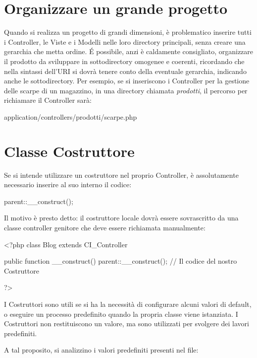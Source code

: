 \section*{Organizzare un grande progetto}
Quando si realizza un progetto di grandi dimensioni, è problematico inserire tutti i Controller, le Viste e i Modelli nelle loro directory principali, senza creare una gerarchia che metta ordine.
\'E possibile, anzi è caldamente consigliato, organizzare il prodotto da sviluppare in sottodirectory omogenee e coerenti, ricordando che nella sintassi dell'\ac{URI} si dovrà tenere conto della eventuale gerarchia, indicando anche le sottodirectory. Per esempio, se si inseriscono i Controller per la gestione delle scarpe di un magazzino, in una directory chiamata \emph{prodotti}, il percorso per richiamare il Controller  sarà:

\begin{code}
application/controllers/prodotti/scarpe.php
\end{code}

\section*{Classe Costruttore}
Se si intende utilizzare un costruttore nel proprio Controller, è assolutamente necessario inserire al suo interno il codice:

\begin{code}
parent::__construct();
\end{code}

Il motivo è presto detto: il costruttore locale dovrà essere sovrascritto da una classe controller genitore che deve essere richiamata manualmente:

\begin{code}
<?php
class Blog extends CI_Controller {

       public function __construct()
       {
            parent::__construct();
            // Il codice del nostro Costruttore
       }
}
?>
\end{code}

I Costruttori sono utili se si ha la necessità di configurare alcuni valori di default, o eseguire un processo predefinito quando la propria classe viene istanziata. I Costruttori non restituiscono un valore, ma sono utilizzati per svolgere dei lavori predefiniti.



A tal proposito, si analizzino i valori predefiniti presenti nel file:

